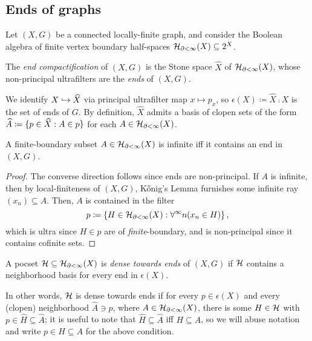 \documentclass[reqno]{amsart}
\begin{document}

    \subsection{Ends of graphs}\label{sec:ends_of_graphs}

    Let $(X,G)$ be a connected locally-finite graph, and consider the Boolean algebra of finite vertex boundary half-spaces $\mathcal{H}_{\partial<\infty}(X)\subseteq2^X$.

    \begin{definition}
        The \textit{end compactification} of $(X,G)$ is the Stone space $\widehat{X}$ of $\mathcal{H}_{\partial<\infty}(X)$, whose non-principal ultrafilters are the \textit{ends} of $(X,G)$.
    \end{definition}

    We identify $X\hookrightarrow\widehat{X}$ via principal ultrafilter map $x\mapsto p_x$, so $\epsilon(X)\coloneqq\widehat{X}\comp X$ is the set of ends of $G$. By definition, $\widehat{X}$ admits a basis of clopen sets of the form $\widehat{A}\coloneqq\{p\in\widehat{X}: A\in p\}$ for each $A\in\mathcal{H}_{\partial<\infty}(X)$.

    \begin{lemma}\label{lem:infinite_iff_contains_end}
        A finite-boundary subset $A\in\mathcal{H}_{\partial<\infty}(X)$ is infinite iff it contains an end in $(X,G)$.
    \end{lemma}
    \begin{proof}
        The converse direction follows since ends are non-principal. If $A$ is infinite, then by local-finiteness of $(X,G)$, K\H{o}nig's Lemma furnishes some infinite ray $(x_n)\subseteq A$. Then, $A$ is contained in the filter
        \begin{equation*}
            p\coloneqq\left\{H\in\mathcal{H}_{\partial<\infty}(X):\forall^\infty n(x_n\in H)\right\},
        \end{equation*}
        which is ultra since $H\in p$ are of \textit{finite}-boundary, and is non-principal since it contains cofinite sets.
    \end{proof}

    \begin{definition}
        A pocset $\mathcal{H}\subseteq\mathcal{H}_{\partial<\infty}(X)$ is \textit{dense towards ends} of $(X,G)$ if $\mathcal{H}$ contains a neighborhood basis for every end in $\epsilon(X)$.

        In other words, $\mathcal{H}$ is dense towards ends if for every $p\in\epsilon(X)$ and every (clopen) neighborhood $\widehat{A}\ni p$, where $A\in\mathcal{H}_{\partial<\infty}(X)$, there is some $H\in\mathcal{H}$ with $p\in\widehat{H}\subseteq\widehat{A}$; it is useful to note that $\widehat{H}\subseteq\widehat{A}$ iff $H\subseteq A$, so we will abuse notation and write $p\in H\subseteq A$ for the above condition.
    \end{definition}
\end{document}
